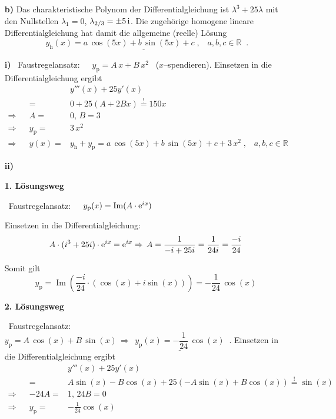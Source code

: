 {\begin{enumerate}
F\"ur\ \ $r=14\,\EH{3x}$\ \ ergibt sich nach ii) : \ \ \ $\underline{\;y_{\text{p}_{2}}(x)=14x\,\EH{3x}\;}\;.$

Allgemeine L\"osung: \ \ \ $\underline{\underline{\;y(x)=y_{\text{h}}+y_{\text{p}_{1}}+y_{\text{p}_{2}} = a\,\EH{2x}+b\,\EH{3x}+3+14x\,\EH{3x}\;,\;\;a,b\in \mathbb{R}\;}}\;.$


\item[\textbf{b)}]  Das charakteristische Polynom der Differentialgleichung ist $\lambda^3+25\lambda$ mit den Nullstellen $\lambda_1=0$, $\lambda_{2/3}=\pm 5\,\mathrm{i}$. Die zugeh\"orige homogene lineare Differentialgleichung hat damit die allgemeine (reelle) L\"osung 
\[
\underline{\;y_{\text{h}}(x)=a\,\cos (5x)+b\,\sin (5x)+c\;,\;\;\;a,b,c\in \mathbb{R}\;}\;. 
\]

\textbf{i)} \ Faustregelansatz:\ \ \ $y_{\text{p}}=A\,x+B\,x^{2}$ \ (\glqq$x$--spendieren\grqq). Einsetzen in die Differentialgleichung ergibt
\begin{align*}
&&&y'''(x)+25y'(x)\\
&&=& 0 + 25(A+2Bx) \overset!= 150 x\\
\Rightarrow && A=&0,\, B=3\\
\Rightarrow&& y_{\text{p}}=&3\,x^{2}\\
\Rightarrow&& y(x)=& y_{\text{h}}+y_{\text{p}} = 
a\,\cos(5x)+b\,\sin(5x)+c+3\,x^{2}\;,\;\;\;a,b,c\in \mathbb{R}
\end{align*}

\textbf{ii)} 

\textbf{1. L\"osungsweg} 

\ Faustregelansatz:\ \ \ $y_{\text{p}}(x)=\operatorname{Im}(A\cdot\mathrm{e}^{ix}) $

Einsetzen in die Differentialgleichung: 
\[A\cdot(i^3+25i)\cdot\mathrm{e}^{ix}=\mathrm{e}^{ix}\Rightarrow\, A=\dfrac{1}{-i+25i}=\dfrac{1}{24i}=\dfrac{-i}{24}\]

Somit gilt 
\[y_{\text{p}}=\operatorname{Im}\left(\dfrac{-i}{24}\cdot(\cos(x)+i\sin(x))\right)=-\dfrac{1}{24}\,\cos (x)\]

\textbf{2. L\"osungsweg} 

\ Faustregelansatz:\ \ \ $y_{\text{p}}=A\,\cos(x)+B\,\sin(x) \,\Rightarrow\,  \underline{\;y_{\text{p}}(x)=-\dfrac{1}{24}\,\cos (x)\;}\;.$
Einsetzen in die Differentialgleichung ergibt
\begin{align*}
&&&y'''(x)+25y'(x)\\
&&=& A\sin(x) -B\cos(x) + 25(-A\sin(x)+B\cos(x)) \overset!= \sin(x)\\
\Rightarrow && -24A=&1,\, 24B=0\\
\Rightarrow&& y_{\text{p}}=&-\frac 1{24}\cos(x)
\end{align*}


\end{enumerate}}
